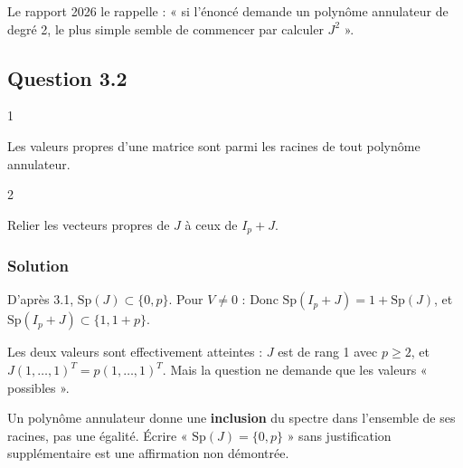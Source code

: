 \documentclass[11pt,a4paper]{article}
\newcommand{\equationajustee}[1]{%
  \sbox{\boiteequation}{$\displaystyle #1$}%
  \ifdim\wd\boiteequation>\linewidth
    \[\resizebox{\linewidth}{!}{\usebox{\boiteequation}}\]%
  \else
    \[#1\]%
  \fi}
\begin{document}
\begin{jury}

Le rapport 2026 le rappelle : « si l'énoncé demande un polynôme annulateur de degré 2, le plus simple semble de commencer par calculer \(J^2\) ».

\end{jury}

\hypertarget{question-3.2}{%
\subsection{Question 3.2}\label{question-3.2}}

\begin{indication}{1}

Les valeurs propres d'une matrice sont parmi les racines de tout polynôme annulateur.

\end{indication}

\begin{indication}{2}

Relier les vecteurs propres de \(J\) à ceux de \(I_p+J\).

\end{indication}

\hypertarget{solution-3}{%
\subsubsection{Solution}\label{solution-3}}

D'après 3.1, \(\mathrm{Sp}(J)\subset\{0,p\}\). Pour \(V\neq0\) :
\equationajustee{\begin{aligned}{}&(I_p+J)V=\nu V\\
\iff\ &JV=(\nu-1)V.
\end{aligned}}
Donc \(\mathrm{Sp}(I_p+J)=1+\mathrm{Sp}(J)\), et \(\mathrm{Sp}(I_p+J)\subset\{1,1+p\}\).

Les deux valeurs sont effectivement atteintes : \(J\) est de rang 1 avec \(p\ge2\), et \(J(1,\dots,1)^T=p(1,\dots,1)^T\). Mais la question ne demande que les valeurs « possibles ».

\begin{piege}

Un polynôme annulateur donne une \textbf{inclusion} du spectre dans l'ensemble de ses racines, pas une égalité. Écrire « \(\mathrm{Sp}(J)=\{0,p\}\) » sans justification supplémentaire est une affirmation non démontrée.

\end{piege}
\end{document}
